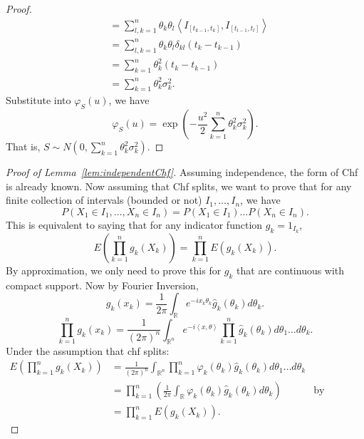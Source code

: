 \begin{proof}
\begin{align*}
		&= \sum_{l,k=1}^{n} \theta_k \theta_l \left\langle I_{[t_{k-1}, t_k]},  I_{[t_{l-1},  t_l]} \right\rangle  \\
		&= \sum_{l,k=1}^{n} \theta_k \theta_l \delta_{kl} \left( t_k - t_{k-1} \right)   \\
		&= \sum_{k=1}^{n} \theta_k ^2 \left( t_k - t_{k-1} \right)   \\
		&= \sum_{k=1}^{n} \theta_k ^2 \sigma_k^2 
	.\end{align*}
	Substitute into $\varphi_S(u)$, we have
	\[
		\varphi_S(u) = \exp\left( - \frac{u^2}{2} \sum_{k=1}^{n} \theta_k^2 \sigma_k^2 \right) 
	.\] 
	That is, $S \sim N(0,\sum_{k=1}^{n} \theta_k^2 \sigma_k^2)$.
\end{proof}

\begin{proof}[Proof of Lemma~\ref{lem:independentChf}]
	Assuming independence, the form of Chf is already known. Now assuming that Chf splits, we want to prove that for any finite collection of intervals (bounded or not)  $I_1, \ldots, I_n$, we have
	\[
		P\left( X_1 \in I_1, \ldots, X_n \in I_n \right) 
		= P(X_1 \in I_1) \ldots P(X_n \in I_n)
	.\] 
	This is equivalent to saying that for any indicator function $g_k = 1_{I_k}$, 
	\[
		E\left( \prod_{k=1}^{n} g_k(X_k)   \right) 
		= \prod_{k=1}^{n} E\left( g_k(X_k) \right)  
	.\] 
	By approximation, we only need to prove this for $g_k$ that are continuous with compact support. Now by Fourier Inversion,
	\[
		g_k(x_k) = \frac{1}{2 \pi} \int _{\mathbb{R}} e^{- i x_k \theta_k} \hat{g} _k (\theta_k) d \theta_k
	.\] 
	\[
		\prod_{k=1}^{n}  g_k(x_k) = 
		\frac{1}{\left( 2 \pi \right)^n } \int _{\mathbb{R}^n} e^{- i \left\langle x, \theta \right\rangle } \prod_{k=1}^{n}   \hat{g} _k (\theta_k) d \theta_1 \ldots d \theta_k
	.\]
	Under the assumption that chf splits:
\begin{align}
	E\left( \prod_{k=1}^{n} g_k(X_k)   \right)
	&=  \frac{1}{\left( 2 \pi \right)^n } 
	\int _{\mathbb{R}^n} \prod_{k=1}^{n} \varphi_k(\theta_k)  \hat{g} _k (\theta_k) d \theta_1 \ldots d \theta_k \\
	&= \prod_{k=1}^{n}\left( \frac{1}{2 \pi} \int _{\mathbb{R}} \varphi_k(\theta_k) \hat{g} _k(\theta_k) d \theta_k\right)  &\text{by Fubini's Theorem}\\
	&= \prod_{k = 1}^{n} E\left( g_k (X_k) \right)  
.\end{align}

\end{proof}










